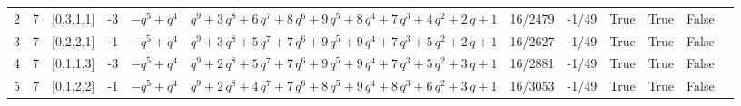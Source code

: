 \documentclass[10pt]{article}
\begin{document}
{\begin{longtable}{@{}llllllllllll@{}}
2 & 7 & [0,3,1,1] & -3 & $-q^{5} + q^{4}$ & $q^{9} + 3\,q^{8} + 6\,q^{7} + 8\,q^{6} + 9\,q^{5} + 8\,q^{4} + 7\,q^{3} + 4\,q^{2} + 2\,q + 1$ & 16/2479 & -1/49 & True & True & False &  \\
3 & 7 & [0,2,2,1] & -1 & $-q^{5} + q^{4}$ & $q^{9} + 3\,q^{8} + 5\,q^{7} + 7\,q^{6} + 9\,q^{5} + 9\,q^{4} + 7\,q^{3} + 5\,q^{2} + 2\,q + 1$ & 16/2627 & -1/49 & True & True & False &  \\
4 & 7 & [0,1,1,3] & -3 & $-q^{5} + q^{4}$ & $q^{9} + 2\,q^{8} + 5\,q^{7} + 7\,q^{6} + 9\,q^{5} + 9\,q^{4} + 7\,q^{3} + 5\,q^{2} + 3\,q + 1$ & 16/2881 & -1/49 & True & True & False &  \\
5 & 7 & [0,1,2,2] & -1 & $-q^{5} + q^{4}$ & $q^{9} + 2\,q^{8} + 4\,q^{7} + 7\,q^{6} + 8\,q^{5} + 9\,q^{4} + 8\,q^{3} + 6\,q^{2} + 3\,q + 1$ & 16/3053 & -1/49 & True & True & False &  \\
\bottomrule
\end{longtable}}
\end{document}
